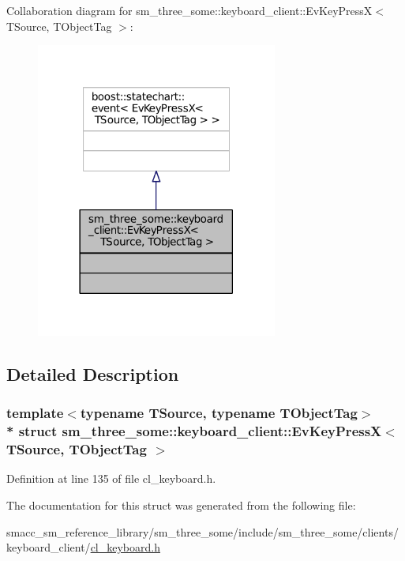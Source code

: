 Collaboration diagram for sm\+\_\+three\+\_\+some\+:\+:keyboard\+\_\+client\+:\+:Ev\+Key\+PressX$<$ T\+Source, T\+Object\+Tag $>$\+:
\nopagebreak
\begin{figure}[H]
\begin{center}
\leavevmode
\includegraphics[width=225pt]{structsm__three__some_1_1keyboard__client_1_1EvKeyPressX__coll__graph}
\end{center}
\end{figure}


\subsection{Detailed Description}
\subsubsection*{template$<$typename T\+Source, typename T\+Object\+Tag$>$\\*
struct sm\+\_\+three\+\_\+some\+::keyboard\+\_\+client\+::\+Ev\+Key\+Press\+X$<$ T\+Source, T\+Object\+Tag $>$}



Definition at line 135 of file cl\+\_\+keyboard.\+h.



The documentation for this struct was generated from the following file\+:\begin{DoxyCompactItemize}
\item 
smacc\+\_\+sm\+\_\+reference\+\_\+library/sm\+\_\+three\+\_\+some/include/sm\+\_\+three\+\_\+some/clients/keyboard\+\_\+client/\hyperlink{cl__keyboard_8h}{cl\+\_\+keyboard.\+h}\end{DoxyCompactItemize}
